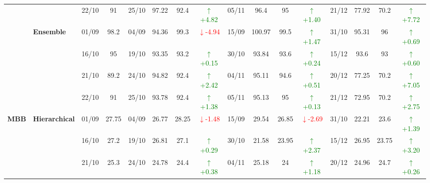 {\begin{longtable}{llcc|cccc|cccc|cccc}
&
& 22/10 & 91 & 25/10 & 97.22 & 92.4 & \textcolor{green}{\(\uparrow\)+4.82} & 05/11 & 96.4 & 95 & \textcolor{green}{\(\uparrow\)+1.40} & 21/12 & 77.92 & 70.2 & \textcolor{green}{\(\uparrow\)+7.72} \\
\cmidrule(lr){2-16}


& \textbf{Ensemble}
& 01/09 & 98.2 & 04/09 & 94.36 & 99.3 & \textcolor{red}{\(\downarrow\)-4.94} & 15/09 & 100.97 & 99.5 & \textcolor{green}{\(\uparrow\)+1.47} & 31/10 & 95.31 & 96 & \textcolor{green}{\(\uparrow\)+0.69} \\

&
& 16/10 & 95 & 19/10 & 93.35 & 93.2 & \textcolor{green}{\(\uparrow\)+0.15} & 30/10 & 93.84 & 93.6 & \textcolor{green}{\(\uparrow\)+0.24} & 15/12 & 93.6 & 93 & \textcolor{green}{\(\uparrow\)+0.60} \\

&
& 21/10 & 89.2 & 24/10 & 94.82 & 92.4 & \textcolor{green}{\(\uparrow\)+2.42} & 04/11 & 95.11 & 94.6 & \textcolor{green}{\(\uparrow\)+0.51} & 20/12 & 77.25 & 70.2 & \textcolor{green}{\(\uparrow\)+7.05} \\

&
& 22/10 & 91 & 25/10 & 93.78 & 92.4 & \textcolor{green}{\(\uparrow\)+1.38} & 05/11 & 95.13 & 95 & \textcolor{green}{\(\uparrow\)+0.13} & 21/12 & 72.95 & 70.2 & \textcolor{green}{\(\uparrow\)+2.75} \\
\midrule



\multirow{12}{*}{\textbf{MBB}} 
& \textbf{Hierarchical}
& 01/09 & 27.75 & 04/09 & 26.77 & 28.25 & \textcolor{red}{\(\downarrow\)-1.48} & 15/09 & 29.54 & 26.85 & \textcolor{red}{\(\downarrow\)-2.69} & 31/10 & 22.21 & 23.6 & \textcolor{green}{\(\uparrow\)+1.39} \\

&
& 16/10 & 27.2 & 19/10 & 26.81 & 27.1 & \textcolor{green}{\(\uparrow\)+0.29} & 30/10 & 21.58 & 23.95 & \textcolor{green}{\(\uparrow\)+2.37} & 15/12 & 26.95 & 23.75 & \textcolor{green}{\(\uparrow\)+3.20} \\

&
& 21/10 & 25.3 & 24/10 & 24.78 & 24.4 & \textcolor{green}{\(\uparrow\)+0.38} & 04/11 & 25.18 & 24 & \textcolor{green}{\(\uparrow\)+1.18} & 20/12 & 24.96 & 24.7 & \textcolor{green}{\(\uparrow\)+0.26} \\


\end{longtable}}
